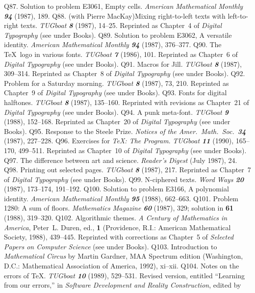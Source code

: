 \p Q87. Solution to problem E3061, Empty cells.
 {\sl American Mathematical Monthly\/ \bf94} (1987), 189.
\p Q88. (with Pierre MacKay)\xskip Mixing right-to-left texts with
 left-to-right texts. {\sl TUGboat \bf 8} (1987), 14--25.
 Reprinted as Chapter~4 of {\sl Digital Typography\/} (see under Books).
\p Q89. Solution to problem E3062, A versatile identity.
 {\sl American Mathematical Monthly\/ \bf94} (1987), 376--377.
\p Q90. The \TeX\ logo in various fonts. {\sl TUGboat\/ \bf 7} (1986), 101.
 Reprinted as Chapter~6 of {\sl Digital Typography\/} (see under Books).
\p Q91. Macros for Jill. {\sl TUGboat\/ \bf8} (1987), 309--314.
 Reprinted as Chapter~8 of {\sl Digital Typography\/} (see under Books).
\p Q92. Problem for a Saturday morning. {\sl TUGboat\/ \bf 8} (1987), 73, 210.
 Reprinted as Chapter~9 of {\sl Digital Typography\/} (see under Books).
\p Q93. Fonts for digital halftones. {\sl TUGboat\/ \bf8} (1987), 135--160.
 Reprinted with revisions as Chapter~21 of {\sl Digital Typography\/}
 (see under Books).
\p Q94. A punk meta-font. {\sl TUGboat\/ \bf9} (1988), 152--168.
 Reprinted as Chapter~20 of {\sl Digital Typography\/} (see under Books).
\p Q95. Response to the Steele Prize. {\sl Notices of the Amer.\ Math.\ Soc.\
 \bf34} (1987), 227--228.
\p Q96. Exercises for {\sl \TeX: The Program}. {\sl TUGboat\/ \bf11}
 (1990), 165--170, 499--511.
 Reprinted as Chapter~10 of {\sl Digital Typography\/} (see under Books).
\p Q97. The difference between art and science. {\sl Reader's Digest\/}
 (July 1987), 24.
\p Q98. Printing out selected pages. {\sl TUGboat\/ \bf8} (1987), 217.
 Reprinted as Chapter~7 of {\sl Digital Typography\/} (see under Books).
\p Q99. N-ciphered texts. {\sl Word Ways\/ \bf20} (1987), 173--174, 191--192.
\p Q100. Solution to problem E3166, A polynomial identity.
 {\sl American Mathematical Monthly\/ \bf95} (1988), 662--663.
\p Q101. Problem 1280: A sum of floors. {\sl Mathematics Magazine\/ \bf60}
  (1987), 329; solution in {\bf61} (1988), 319--320.
\p Q102. Algorithmic themes. {\sl A Century of Mathematics in America},
  Peter~L. Duren, ed., {\bf1} (Providence, R.I.:
  American Mathematical Society, 1988), 439--445.
 Reprinted with corrections as Chapter~5 of {\sl Selected Papers on
 Computer Science\/} (see under Books).
\p Q103. Introduction to {\sl Mathematical Circus\/} by Martin Gardner,
 MAA Spectrum edition (Washington, D.C.: Mathematical Association of
 America, 1992), xi--xii.
\p Q104. Notes on the errors of \TeX. {\sl TUGboat\/ \bf10} (1989), 529--531.
 Revised version, entitled ``Learning from our errors,'' in
 {\sl Software Development and Reality Construction}, edited by
